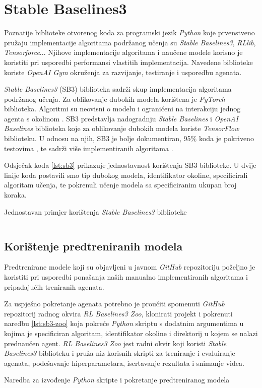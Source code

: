 \chapter{Stable Baselines3}
\label{chap:sb3}

Poznatije biblioteke otvorenog koda za programski jezik \textit{Python} koje prvenstveno pružaju implementacije algoritama podržanog učenja su \textit{Stable Baselines3}, \textit{RLlib}, \textit{Tensorforce}... Njihove implementacije algoritama i naučene modele korisno je koristiti pri usporedbi performansi vlastitih implementacija. Navedene biblioteke koriste \textit{OpenAI Gym} okruženja za razvijanje, testiranje i usporedbu agenata.

\textit{Stable Baselines3} (SB3) biblioteka sadrži skup implementacija algoritama podržanog učenja. Za oblikovanje dubokih modela korištena je \textit{PyTorch} biblioteka. Algoritmi su neovisni o modelu  i ograničeni na interakciju jednog agenta s okolinom . SB3 predstavlja nadogradnju \textit{Stable Baselines} i \textit{OpenAI Baselines} biblioteka koje za oblikovanje dubokih modela koriste \textit{TensorFlow} biblioteku. U odnosu na njih, SB3 je bolje dokumentiran, 95\% koda je pokriveno testovima , te sadrži više implementiranih algoritama \cite{SB3}. 

Odsječak koda \ref{lst:sb3} prikazuje jednostavnost korištenja SB3 biblioteke. U dvije linije koda postavili smo tip dubokog modela, identifikator okoline, specificirali algoritam učenja, te pokrenuli učenje modela sa specificiranim ukupan broj koraka.

\begin{listing}[H]
    \caption{Jednostavan primjer korištenja \textit{Stable Baselines3} biblioteke}
    \inputminted{python}{snippets/sb3.py}
    \label{lst:sb3}
\end{listing}

\section{Korištenje predtreniranih modela}

Predtrenirane modele koji su objavljeni u javnom \textit{GitHub} repozitoriju \cite{sb3-alg-repo} poželjno je koristiti pri usporedbi ponašanja naših manualno implementiranih algoritama i pripadajućih treniranih agenata.

Za uspješno pokretanje agenata potrebno je proučiti spomenuti \textit{GitHub} repozitorij radnog okvira \textit{RL Baselines3 Zoo}, klonirati projekt i pokrenuti naredbu \ref{lst:sb3-zoo} koja pokreće \textit{Python} skriptu s dodatnim argumentima u kojima je specificiran algoritam, identifikator okoline i direktorij u kojem se nalazi prednaučen agent. \textit{RL Baselines3 Zoo} jest radni okvir koji koristi \textit{Stable Baselines3} biblioteku i pruža niz korisnih skripti za treniranje i evaluiranje agenata, podešavanje hiperparametara, iscrtavanje rezultata i snimanje videa.

\begin{listing}[H]
    \caption{Naredba za izvođenje \textit{Python} skripte i pokretanje predtreniranog modela}
    \inputminted{powershell}{snippets/sb3-zoo.txt}
    \label{lst:sb3-zoo}
\end{listing}
